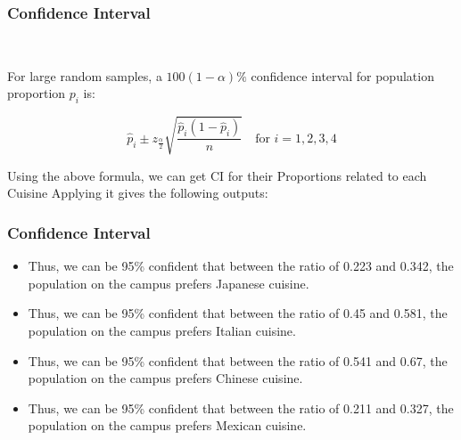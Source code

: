 \documentclass{beamer}
\begin{document}
\begin{frame}
    \frametitle{Confidence Interval}\
    \begin{block}{}
    For large random samples, a $100(1 - \alpha)\%$ confidence interval for population proportion $p_i$ is:
    
    \[
    \hat{p}_i \pm z_{\frac{\alpha}{2}} \sqrt{\frac{\hat{p}_i(1 - \hat{p}_i)}{n}}
    \quad \text{for } i = 1, 2, 3, 4
    \]
    \end{block}
    Using the above formula, we can get CI for their Proportions related to each Cuisine
    Applying it gives the following outputs: \\
    
     
    
\end{frame}


\begin{frame}
    \frametitle{Confidence Interval}
    
    \begin{itemize}
        \item Thus, we can be 95\% confident that between the ratio of 0.223 and 0.342, the population on the campus prefers Japanese cuisine.
        
        \item Thus, we can be 95\% confident that between the ratio of 0.45 and 0.581, the population on the campus prefers Italian cuisine.
        
        \item Thus, we can be 95\% confident that between the ratio of 0.541 and 0.67, the population on the campus prefers Chinese cuisine.
        
        \item Thus, we can be 95\% confident that between the ratio of 0.211 and 0.327, the population on the campus prefers Mexican cuisine.
    \end{itemize}
\end{frame}

\end{document}
